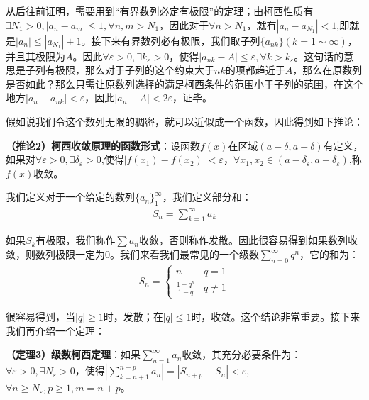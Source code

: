 \documentclass{ctexart}
\let\oldtextbf\textbf
\renewcommand{\textbf}[1]{\textcolor{brown!50!red}{\oldtextbf{#1}}}
\begin{document}
从后往前证明，需要用到“\colorbox{pink!30!white}{有界数列必定有极限}”的定理；由柯西性质有$\exists N_1>0,|a_n-a_m|\leq 1,\forall n,m> N_1$，因此对于$\forall n>N_1$，就有$|a_n-a_{N_1}|<1$,即就是$|a_n|\leq |a_{N_1}|+1 $。接下来有界数列必有极限，我们取子列$\{a_{nk}\}(k=1\sim\infty)$，并且其极限为$A$。因此$\forall \varepsilon>0,\exists k_\varepsilon>0$，使得$|a_{nk}-A|\leq\varepsilon,\forall k>k_\varepsilon$。这句话的意思是子列有极限，那么对于子列的这个约束大于$nk$的项都趋近于$A$，那么在原数列是否如此？那么只需让原数列选择的满足柯西条件的范围小于子列的范围，在这个地方$|a_n-a_{nk}|<\varepsilon$，因此$|a_n-A|<2\varepsilon$，证毕。

假如说我们令这个数列无限的稠密，就可以近似成一个函数，因此得到如下推论：
\begin{tcolorbox}[
    colback=bac2,     %
    colframe=fra2,   %
    coltitle=white,             %
    coltext=tex2,
    title=圆角框,
    fonttitle=\bfseries,        %
arc=3mm,                     %
breakable
]
\textbf{\color{brown!50!red}（推论2）柯西收敛原理的函数形式}：设函数$f(x)$在区域$(a-\delta,a+\delta)$有定义，如果对$\forall \varepsilon>0,\exists \delta_\varepsilon>0$,使得$|f(x_1)-f(x_2)|<\varepsilon，\forall x_1,x_2\in(a-\delta_\varepsilon,a+\delta_\varepsilon)$,称$f(x)$收敛。
\end{tcolorbox}

我们定义对于一个给定的数列$\{a_n\}_1^\infty$，我们定义部分和：
\begin{align*}
    S_n=\sum_{k=1}^\infty  a_k
\end{align*}

如果$S_k$有极限，我们称作$\sum a_n$收敛，否则称作发散。因此很容易得到如果数列收敛，则数列极限一定为0。我们来看我们最常见的一个级数$\sum_{n=0}^\infty q^n$，它的和为：
\begin{align*}
S_n=\begin{cases}
n & q=1\\
\frac{1-q^n}{1-q}&q\neq 1 
\end{cases}
\end{align*}

很容易得到，当\colorbox{pink!30!white}{$|q|\geq 1$时，发散；在$|q|\leq 1$时，收敛}。这个结论非常重要。接下来我们再介绍一个定理：
\begin{tcolorbox}[
    colback=bac2,     %
    colframe=fra2,   %
    coltitle=white,             %
    coltext=tex2,
    title=级数柯西定理,
    fonttitle=\bfseries,        %
arc=3mm,                     %
breakable
]
\textbf{\color{brown!50!red}（定理3）级数柯西定理}：如果$\sum_{n=1}^\infty a_n$收敛，其充分必要条件为：$\forall \varepsilon>0,\exists N_\varepsilon>0$，使得$|\sum_{k=n+1}^{n+p}a_n|=|S_{n+p}-S_n|<\varepsilon$,$\forall n\geq N_\varepsilon,p\geq 1,m=n+p$。
\end{tcolorbox}
\end{document}
